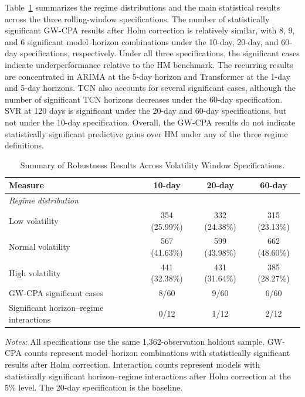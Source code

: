 \documentclass[12pt,twoside]{ord}
\begin{document}
Table~\ref{tab:volatility_window_robustness} summarizes the regime distributions and the main statistical results across the three rolling-window specifications. The number of statistically significant GW-CPA results after Holm correction is relatively similar, with 8, 9, and 6 significant model--horizon combinations under the 10-day, 20-day, and 60-day specifications, respectively. Under all three specifications, the significant cases indicate underperformance relative to the HM benchmark. The recurring results are concentrated in ARIMA at the 5-day horizon and Transformer at the 1-day and 5-day horizons. TCN also accounts for several significant cases, although the number of significant TCN horizons decreases under the 60-day specification. SVR at 120 days is significant under the 20-day and 60-day specifications, but not under the 10-day specification. Overall, the GW-CPA results do not indicate statistically significant predictive gains over HM under any of the three regime definitions.

\begin{table}[htbp]
\centering
\caption{Summary of Robustness Results Across Volatility Window Specifications.}\label{tab:volatility_window_robustness}
\setlength{\tabcolsep}{6pt}
\begin{tabular}{lccc}
\hline
\textbf{Measure} & \textbf{10-day} & \textbf{20-day} & \textbf{60-day} \\
\hline
\multicolumn{4}{l}{\textit{Regime distribution}} \\
Low volatility & 354 (25.99\%) & 332 (24.38\%) & 315 (23.13\%) \\
Normal volatility & 567 (41.63\%) & 599 (43.98\%) & 662 (48.60\%) \\
High volatility & 441 (32.38\%) & 431 (31.64\%) & 385 (28.27\%) \\
\hline
GW-CPA significant cases & 8/60 & 9/60 & 6/60 \\
Significant horizon--regime interactions & 0/12 & 1/12 & 2/12 \\
\hline
\end{tabular}
\par\vspace{4pt}\parbox{\linewidth}{\fontsize{9pt}{12pt}\selectfont\textit{Notes:} All specifications use the same 1,362-observation holdout sample. GW-CPA counts represent model--horizon combinations with statistically significant results after Holm correction. Interaction counts represent models with statistically significant horizon--regime interactions after Holm correction at the 5\% level. The 20-day specification is the baseline.}
\end{table}
\end{document}
